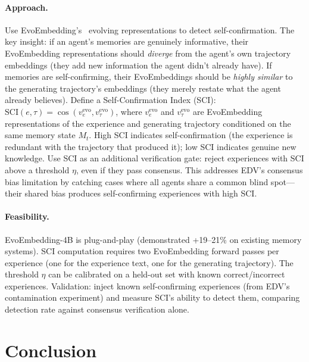 \documentclass[11pt,a4paper]{article}
\begin{document}
\paragraph{Approach.} Use EvoEmbedding's~\cite{nie2026evoembedding} evolving representations to detect self-confirmation. The key insight: if an agent's memories are genuinely informative, their EvoEmbedding representations should \emph{diverge} from the agent's own trajectory embeddings (they add new information the agent didn't already have). If memories are self-confirming, their EvoEmbeddings should be \emph{highly similar} to the generating trajectory's embeddings (they merely restate what the agent already believes). Define a Self-Confirmation Index (SCI): $\mathrm{SCI}(e, \tau) = \cos(v_e^{\mathrm{evo}}, v_\tau^{\mathrm{evo}})$, where $v_e^{\mathrm{evo}}$ and $v_\tau^{\mathrm{evo}}$ are EvoEmbedding representations of the experience and generating trajectory conditioned on the same memory state $M_t$. High SCI indicates self-confirmation (the experience is redundant with the trajectory that produced it); low SCI indicates genuine new knowledge. Use SCI as an additional verification gate: reject experiences with SCI above a threshold $\eta$, even if they pass consensus. This addresses EDV's consensus bias limitation by catching cases where all agents share a common blind spot---their shared bias produces self-confirming experiences with high SCI.

\paragraph{Feasibility.} EvoEmbedding-4B is plug-and-play (demonstrated +19--21\% on existing memory systems). SCI computation requires two EvoEmbedding forward passes per experience (one for the experience text, one for the generating trajectory). The threshold $\eta$ can be calibrated on a held-out set with known correct/incorrect experiences. Validation: inject known self-confirming experiences (from EDV's contamination experiment) and measure SCI's ability to detect them, comparing detection rate against consensus verification alone.

\section{Conclusion}
\end{document}
